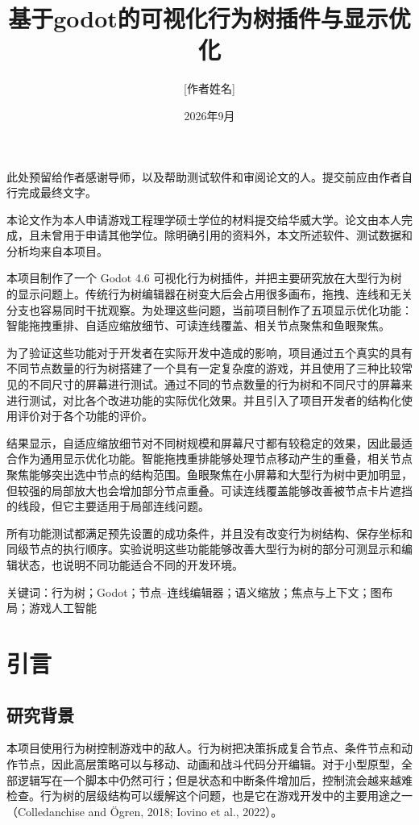 \documentclass[11pt,a4paper,oneside,extrafontsizes]{memoir}
\title{基于godot的可视化行为树插件与显示优化}
\author{[作者姓名]}
\date{2026年9月}
\begin{document}
\frontmatter
{}
\tableofcontents
\clearforchapter\listoffigures
\clearforchapter\listoftables


此处预留给作者感谢导师，以及帮助测试软件和审阅论文的人。提交前应由作者自行完成最终文字。


本论文作为本人申请游戏工程理学硕士学位的材料提交给华威大学。论文由本人完成，且未曾用于申请其他学位。除明确引用的资料外，本文所述软件、测试数据和分析均来自本项目。


本项目制作了一个 Godot 4.6 可视化行为树插件，并把主要研究放在大型行为树的显示问题上。传统行为树编辑器在树变大后会占用很多画布，拖拽、连线和无关分支也容易同时干扰观察。为处理这些问题，当前项目制作了五项显示优化功能：智能拖拽重排、自适应缩放细节、可读连线覆盖、相关节点聚焦和鱼眼聚焦。

为了验证这些功能对于开发者在实际开发中造成的影响，项目通过五个真实的具有不同节点数量的行为树搭建了一个具有一定复杂度的游戏，并且使用了三种比较常见的不同尺寸的屏幕进行测试。通过不同的节点数量的行为树和不同尺寸的屏幕来进行测试，对比各个改进功能的实际优化效果。并且引入了项目开发者的结构化使用评价对于各个功能的评价。

结果显示，自适应缩放细节对不同树规模和屏幕尺寸都有较稳定的效果，因此最适合作为通用显示优化功能。智能拖拽重排能够处理节点移动产生的重叠，相关节点聚焦能够突出选中节点的结构范围。鱼眼聚焦在小屏幕和大型行为树中更加明显，但较强的局部放大也会增加部分节点重叠。可读连线覆盖能够改善被节点卡片遮挡的线段，但它主要适用于局部连线问题。

所有功能测试都满足预先设置的成功条件，并且没有改变行为树结构、保存坐标和同级节点的执行顺序。实验说明这些功能能够改善大型行为树的部分可测显示和编辑状态，也说明不同功能适合不同的开发环境。

关键词：行为树；Godot；节点–连线编辑器；语义缩放；焦点与上下文；图布局；游戏人工智能

\mainmatter

\chapter{引言}

\section{研究背景}

本项目使用行为树控制游戏中的敌人。行为树把决策拆成复合节点、条件节点和动作节点，因此高层策略可以与移动、动画和战斗代码分开编辑。对于小型原型，全部逻辑写在一个脚本中仍然可行；但是状态和中断条件增加后，控制流会越来越难检查。行为树的层级结构可以缓解这个问题，也是它在游戏开发中的主要用途之一（Colledanchise and Ögren, 2018; Iovino et al., 2022）。
\end{document}
